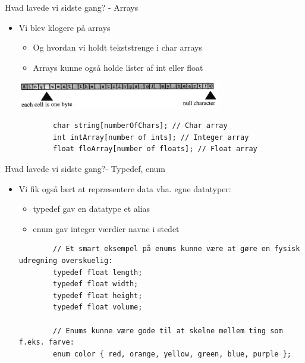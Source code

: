 \documentclass{beamer}
\begin{document}
\begin{frame}[fragile]{Hvad lavede vi sidste gang? - Arrays}
	\begin{itemize}
		\item{Vi blev klogere på {\color{dkgreen}arrays}}
		\begin{itemize}
			\item{Og hvordan vi holdt tekststrenge i {\color{C_darkblue}char arrays}}
			\item{Arrays kunne også holde lister af {\color{C_darkblue}int} eller {\color{C_darkblue}float}}
		\end{itemize}
		\begin{center}
				\includegraphics[width=0.7\textwidth]{assets/char_array.png}
		\end{center}
		\begin{lstlisting}
		char string[numberOfChars]; // Char array
		int intArray[number of ints]; // Integer array 
		float floArray[number of floats]; // Float array 
		\end{lstlisting}
	\end{itemize}
\end{frame}

\begin{frame}[fragile]{Hvad lavede vi sidste gang?- Typedef, enum}
	\begin{itemize}
		\item{Vi fik også lært at repræsentere data vha. egne datatyper:}
		\begin{itemize}
			\item{{\color{C_darkblue}typedef} gav en datatype et alias}
			\item{{\color{C_darkblue}enum} gav integer værdier navne i stedet}
		\end{itemize}
		\begin{lstlisting}
		// Et smart eksempel på enums kunne være at gøre en fysisk udregning overskuelig:
		typedef float length;
		typedef float width;
		typedef float height;
		typedef float volume;

		// Enums kunne være gode til at skelne mellem ting som f.eks. farve:
		enum color { red, orange, yellow, green, blue, purple };
		\end{lstlisting}
	\end{itemize}
\end{frame}
\end{document}

